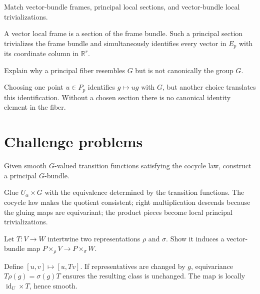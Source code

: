\begin{problem}\label{prob:vii08-11}
Match vector-bundle frames, principal local sections, and vector-bundle local trivializations.
\end{problem}
\begin{solution}
A vector local frame is a section of the frame bundle. Such a principal section trivializes the frame bundle and simultaneously identifies every vector in \(E_p\) with its coordinate column in \(\mathbb R^r\).
\end{solution}

\begin{problem}\label{prob:vii08-12}
Explain why a principal fiber resembles \(G\) but is not canonically the group \(G\).
\end{problem}
\begin{solution}
Choosing one point \(u\in P_p\) identifies \(g\mapsto ug\) with \(G\), but another choice translates this identification. Without a chosen section there is no canonical identity element in the fiber.
\end{solution}


\section{Challenge problems}

\begin{problem}\label{prob:vii08-ch01}
Given smooth \(G\)-valued transition functions satisfying the cocycle law, construct a principal \(G\)-bundle.
\end{problem}
\begin{solution}
Glue \(U_\alpha\times G\) with the equivalence determined by the transition functions. The cocycle law makes the quotient consistent; right multiplication descends because the gluing maps are equivariant; the product pieces become local principal trivializations.
\end{solution}

\begin{problem}\label{prob:vii08-ch02}
Let \(T:V\to W\) intertwine two representations \(\rho\) and \(\sigma\). Show it induces a vector-bundle map \(P\times_\rho V\to P\times_\sigma W\).
\end{problem}
\begin{solution}
Define \([u,v]\mapsto[u,Tv]\). If representatives are changed by \(g\), equivariance \(T\rho(g)=\sigma(g)T\) ensures the resulting class is unchanged. The map is locally \(\operatorname{id}_U\times T\), hence smooth.
\end{solution}

